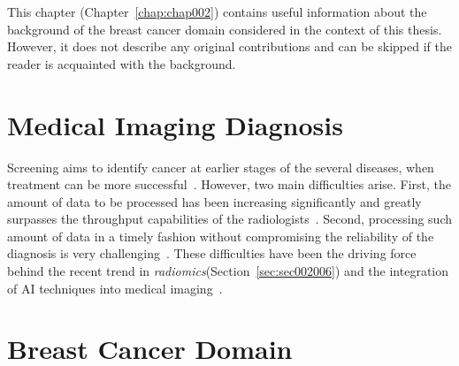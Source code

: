 \clearpage
\label{chap:chap002}

This chapter (Chapter~\ref{chap:chap002}) contains useful information about the background of the breast cancer domain considered in the context of this thesis.
However, it does not describe any original contributions and can be skipped if the reader is acquainted with the background.

\section{Medical Imaging Diagnosis}
\label{sec:sec002001}

Screening aims to identify cancer at earlier stages of the several diseases, when treatment can be more successful~\cite{McKinney2020}.
However, two main difficulties arise.
First, the amount of data to be processed has been increasing significantly and greatly surpasses the throughput capabilities of the radiologists~\cite{HANNA20181709}.
Second, processing such amount of data in a timely fashion without compromising the reliability of the diagnosis is very challenging~\cite{waite2017systemic, stec2018systematic}.
These difficulties have been the driving force behind the recent trend in {\it radiomics}\footnotemark[4] (Section~\ref{sec:sec002006}) and the integration of \ac{AI} techniques into medical imaging~\cite{Lambin2017, pesapane2018artificial, doi:10.1148/radiol.2015151169}.


\section{Breast Cancer Domain}
\label{sec:sec002002}

